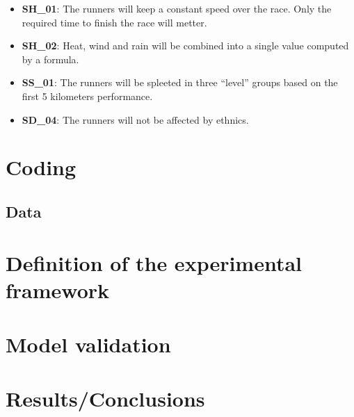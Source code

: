 \documentclass[conference]{IEEEtran}
\begin{document}
\begin{itemize}
    \item \textbf{SH\_01}: The runners will keep a constant speed over the race. Only the required time to finish the race will metter.
    \item \textbf{SH\_02}: Heat, wind and rain will be combined into a single value computed by a formula.
    \item \textbf{SS\_01}: The runners will be spleeted in three ``level'' groups based on the first 5 kilometers performance.
    \item \textbf{SD\_04}: The runners will not be affected by ethnics.
\end{itemize}

\section{Coding}
\subsection{Data}
\section{Definition of the experimental framework}
\section{Model validation}
\section{Results/Conclusions}
\end{document}
